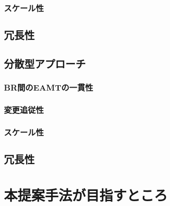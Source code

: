 \subsubsection{スケール性}
\subsection{冗長性}


\subsection{分散型アプローチ}

\subsubsection{BR間のEAMTの一貫性}
\subsubsection{変更追従性}
\subsubsection{スケール性}
\subsection{冗長性}


\section{本提案手法が目指すところ}


